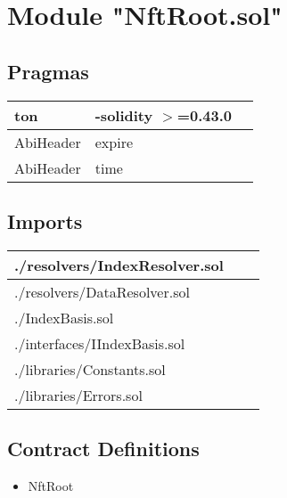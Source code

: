 
\section{Module "NftRoot.sol"}


\subsection{Pragmas}


\noindent\begin{tabular}{|l|l|p{5cm}|}\hline
ton & -solidity $>$=0.43.0 &\\\hline
AbiHeader &  expire &\\\hline
AbiHeader &  time &\\\hline
\end{tabular}


\subsection{Imports}


\noindent\begin{tabular}{|l|l|p{5cm}|}\hline
./resolvers/IndexResolver.sol &\\\hline
./resolvers/DataResolver.sol &\\\hline
./IndexBasis.sol &\\\hline
./interfaces/IIndexBasis.sol &\\\hline
./libraries/Constants.sol &\\\hline
./libraries/Errors.sol &\\\hline
\end{tabular}


\subsection{Contract Definitions}

\begin{itemize}
\item NftRoot
\end{itemize}
